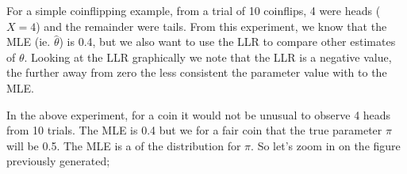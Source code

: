 \documentclass[letterpaper,10pt,english]{jupyterBook}
\begin{document}
\sphinxAtStartPar
For a simple coin\sphinxhyphen{}flipping example, from a trial of 10 coin\sphinxhyphen{}flips, 4 were heads (\(X=4\)) and the remainder were tails. From this experiment, we know that the MLE (ie. \(\hat\theta\)) is 0.4, but we also want to use the LLR to compare other estimates of \(\theta\). Looking at the LLR graphically we note that the LLR is a negative value, the further away from zero the less consistent the parameter value with to the MLE.

\begin{sphinxVerbatim}[commandchars=\\\{\}]
 
    
   
   
\end{sphinxVerbatim}

\noindent{}

\sphinxAtStartPar
In the above experiment, for a  coin it would not be unusual to observe 4 heads from 10 trials. The MLE is 0.4 but we  for a fair coin that the true parameter \(\pi\) will be 0.5. The MLE is a  of the distribution for \(\pi\). So let’s zoom in on the figure previously generated;
\end{document}

